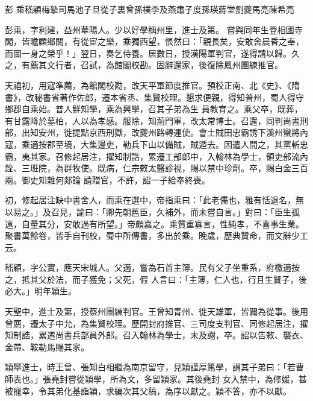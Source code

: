 
\begin{pinyinscope}

 彭
 乘嵇穎梅摯司馬池子旦從子裏曾孫樸李及燕肅子度孫瑛蔣堂劉夔馬亮陳希亮



 彭乘，字利建，益州華陽人。少以好學稱州里，進士及第。
 嘗與同年生登相國寺閣，皆瞻顧鄉關，有從宦之樂，乘獨西望，悵然曰：「親長矣，安敢舍晨昏之奉，而圖一身之榮乎！」翌日，奏乞侍養。居數日，授漢陽軍判官，遂得請以歸。久之，有薦其文行者，召試，為館閣校勘。固辭還家，後復除鳳州團練推官。



 天禧初，用寇準薦，為館閣校勘，改天平軍節度推官。預校正南、北《史》、《隋書》，改秘書省著作佐郎，遷本省丞、集賢校理。懇求便親，得知普州，蜀人得守鄉郡自乘始。普人鮮知學，乘為興學，召其子弟為生
 員教育之。乘父卒，既葬，有甘露降於墓柏，人以為孝感。服除，知荊門軍，改太常博士。召還，同判尚書刑部，出知安州，徙提點京西刑獄，改夔州路轉運使。會土賊田忠霸誘下溪州蠻將內寇，乘適按郡至境，大集邊吏，勒兵下山以備賊，賊遁去。因遣人間之，其黨斬忠霸，夷其家。召修起居注，擢知制誥，累遷工部郎中，入翰林為學士，領吏部流內銓、三班院，為群牧使。既病，仁宗敕太醫診視，賜以禁中珍劑。卒，賜白金三百兩。御史知雜何郯論
 請贈官，不許，詔一子給奉終喪。



 初，修起居注缺中書舍人，而乘在選中，帝指乘曰：「此老儒也，雅有恬退名，無以易之。」及召見，諭曰：「卿先朝舊臣，久補外，而未嘗自言。」對曰：「臣生孤遠，自量其分，安敢過有所望。」帝頗嘉之。乘質重寡言，性純孝，不喜事生業。聚書萬餘卷，皆手自刊校，蜀中所傳書，多出於乘。晚歲，歷典贊命，而文辭少工云。



 嵇穎，字公實，應天宋城人。父適，嘗為石首主簿。民有父子坐重系，府檄適按之，抵其父於法，而子獲免；父死，假
 人言曰：「主簿，仁人也，行且生賢子，後必大。」明年穎生。



 天聖中，進士及第，授蔡州團練判官。王曾知青州、徙天雄軍，皆闢為從事。後用曾薦，遷太子中允，為集賢校理。歷開封府推官、三司度支判官、同修起居注，擢知制誥，累遷尚書兵部員外郎。召入翰林為學士，未及謝，卒。詔以告敕、襲衣、金帶、鞍勒馬賜其家。



 穎舉進士，時王曾、張知白相繼為南京留守，見穎謹厚篤學，謂其子弟曰：「若曹師表也。」張堯封嘗從穎學，所為文，多留穎家。其後堯封
 女入禁中，為修媛，甚被寵幸，令其弟化基詣穎，求編次其父稿，為序以獻之。穎不答，亦不以獻。




\end{pinyinscope}
